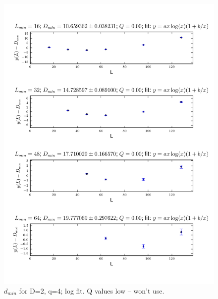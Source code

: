 \documentclass[pre,preprint]{revtex4}
\begin{document}
\begin{figure}[htp]
\centering
\includegraphics[width=.85\textwidth]{figures/d_min_D2q4_46_log_fig}
\caption{$d_{min}$ for D=2, q=4; log fit. Q values low -- won't use. }\label{fig:4}
\end{figure}

\end{document}

